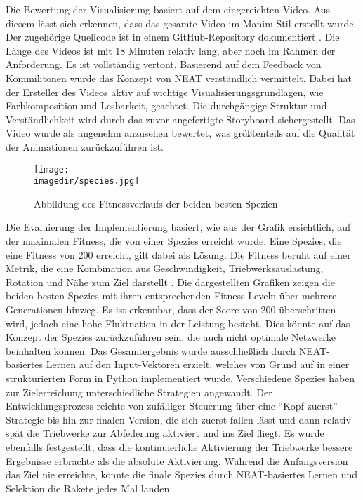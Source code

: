 Die Bewertung der Visualisierung basiert auf dem eingereichten Video. Aus diesem lässt sich erkennen, dass das gesamte Video im Manim-Stil erstellt wurde. Der zugehörige Quellcode ist in einem GitHub-Repository dokumentiert \cite{githubdoc}. Die Länge des Videos ist mit 18 Minuten relativ lang, aber noch im Rahmen der Anforderung. Es ist vollständig vertont. Basierend auf dem Feedback von Kommilitonen wurde das Konzept von NEAT verständlich vermittelt. Dabei hat der Ersteller des Videos aktiv auf wichtige Visualisierungsgrundlagen, wie Farbkomposition und Lesbarkeit, geachtet. Die durchgängige Struktur und Verständlichkeit wird durch das zuvor angefertigte Storyboard sichergestellt. Das Video wurde als angenehm anzusehen bewertet, was größtenteils auf die Qualität der Animationen zurückzuführen ist.

\begin{figure}[h] %
	\centering %
	\texttt{[image: \\imagedir/species.jpg]} %
	\caption{Abbildung des Fitnessverlaufs der beiden besten Spezien} %
\end{figure}

Die Evaluierung der Implementierung basiert, wie aus der Grafik ersichtlich, auf der maximalen Fitness, die von einer Spezies erreicht wurde. Eine Spezies, die eine Fitness von 200 erreicht, gilt dabei als Lösung. Die Fitness beruht auf einer Metrik, die eine Kombination aus Geschwindigkeit, Triebwerksauslastung, Rotation und Nähe zum Ziel darstellt \cite{gymnasiumdoc}. Die dargestellten Grafiken zeigen die beiden besten Spezies mit ihren entsprechenden Fitness-Leveln über mehrere Generationen hinweg. Es ist erkennbar, dass der Score von 200 überschritten wird, jedoch eine hohe Fluktuation in der Leistung besteht. Dies könnte auf das Konzept der Spezies zurückzuführen sein, die auch nicht optimale Netzwerke beinhalten können. Das Gesamtergebnis wurde ausschließlich durch NEAT-basiertes Lernen auf den Input-Vektoren erzielt, welches von Grund auf in einer strukturierten Form in Python implementiert wurde. Verschiedene Spezies haben zur Zielerreichung unterschiedliche Strategien angewandt. Der Entwicklungsprozess reichte von zufälliger Steuerung über eine \enquote{Kopf-zuerst}-Strategie bis hin zur finalen Version, die sich zuerst fallen lässt und dann relativ spät die Triebwerke zur Abfederung aktiviert und ins Ziel fliegt. Es wurde ebenfalls festgestellt, dass die kontinuierliche Aktivierung der Triebwerke bessere Ergebnisse erbrachte als die absolute Aktivierung. Während die Anfangsversion das Ziel nie erreichte, konnte die finale Spezies durch NEAT-basiertes Lernen und Selektion die Rakete jedes Mal landen.

